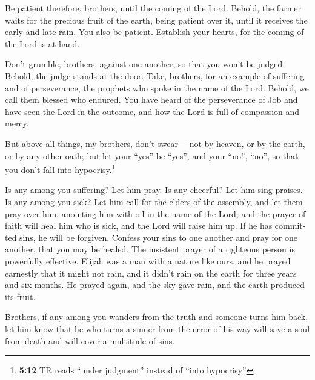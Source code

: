 \begin{paracol}{2}
\begin{otherlanguage}{english}
 Be patient therefore, brothers, until the coming of the
Lord. Behold, the farmer waits for the precious fruit of the earth,
being patient over it, until it receives the early and late rain.
 You also be patient. Establish your hearts, for the
coming of the Lord is at hand.

 Don't grumble, brothers, against one another, so that you
won't be judged. Behold, the judge stands at the door. 
Take, brothers, for an example of suffering and of perseverance, the
prophets who spoke in the name of the Lord.  Behold, we
call them blessed who endured. You have heard of the perseverance of Job
and have seen the Lord in the outcome, and how the Lord is full of
compassion and mercy.

 But above all things, my brothers, don't swear--- not by
heaven, or by the earth, or by any other oath; but let your ``yes'' be
``yes'', and your ``no'', ``no'', so that you don't fall into
hypocrisy.\footnote{\textbf{5:12} TR reads ``under judgment'' instead of
  ``into hypocrisy''}

 Is any among you suffering? Let him pray. Is any
cheerful? Let him sing praises.  Is any among you sick?
Let him call for the elders of the assembly, and let them pray over him,
anointing him with oil in the name of the Lord;  and the
prayer of faith will heal him who is sick, and the Lord will raise him
up. If he has committed sins, he will be forgiven. 
Confess your sins to one another and pray for one another, that you may
be healed. The insistent prayer of a righteous person is powerfully
effective.  Elijah was a man with a nature like ours, and
he prayed earnestly that it might not rain, and it didn't rain on the
earth for three years and six months.  He prayed again,
and the sky gave rain, and the earth produced its fruit.

 Brothers, if any among you wanders from the truth and
someone turns him back,  let him know that he who turns a
sinner from the error of his way will save a soul from death and will
cover a multitude of sins. \end{otherlanguage}
\end{paracol}
